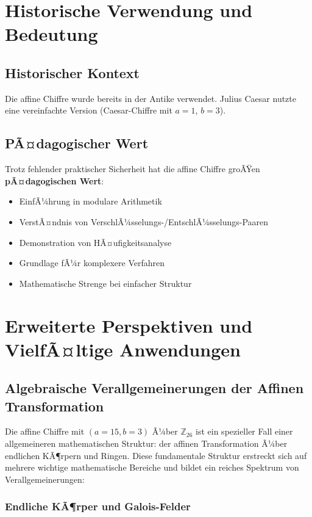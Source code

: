 ﻿\documentclass[12pt,a4paper]{article}
\begin{document}
	\section{Historische Verwendung und Bedeutung}
	
	\subsection{Historischer Kontext}
	
	Die affine Chiffre wurde bereits in der Antike verwendet. Julius Caesar nutzte eine vereinfachte Version (Caesar-Chiffre mit $a=1$, $b=3$).
	
	\subsection{PÃ¤dagogischer Wert}
	
	Trotz fehlender praktischer Sicherheit hat die affine Chiffre groÃŸen \textbf{pÃ¤dagogischen Wert}:
	
	\begin{itemize}
		\item EinfÃ¼hrung in modulare Arithmetik
		\item VerstÃ¤ndnis von VerschlÃ¼sselungs-/EntschlÃ¼sselungs-Paaren
		\item Demonstration von HÃ¤ufigkeitsanalyse
		\item Grundlage fÃ¼r komplexere Verfahren
		\item Mathematische Strenge bei einfacher Struktur
	\end{itemize}
	
	\section{Erweiterte Perspektiven und VielfÃ¤ltige Anwendungen}
	
	\subsection{Algebraische Verallgemeinerungen der Affinen Transformation}
	
	Die affine Chiffre mit $(a=15, b=3)$ Ã¼ber $\mathbb{Z}_{26}$ ist ein spezieller Fall einer allgemeineren mathematischen Struktur: der affinen Transformation Ã¼ber endlichen KÃ¶rpern und Ringen. Diese fundamentale Struktur erstreckt sich auf mehrere wichtige mathematische Bereiche und bildet ein reiches Spektrum von Verallgemeinerungen:
	
	\subsubsection{Endliche KÃ¶rper und Galois-Felder}
	
\end{document}
